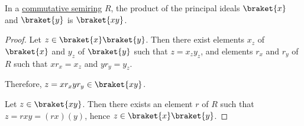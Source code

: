 \begin{proposition}\label{thm:product_of_principal_ideals}
  In a \hyperref[def:semiring/commutative]{commutative semiring} \( R \), the product of the principal ideals \( \braket{x} \) and \( \braket{y} \) is \( \braket{xy} \).
\end{proposition}
\begin{proof}
  \SufficiencySubProof Let \( z \in \braket{x} \braket{y} \). Then there exist elements \( x_z \) of \( \braket{x} \) and \( y_z \) of \( \braket{y} \) such that \( z = x_z y_z \), and elements \( r_x \) and \( r_y \) of \( R \) such that \( x r_x = x_z \) and \( y r_y = y_z \).

  Therefore, \( z = x r_x y r_y \in \braket{xy} \).

  \NecessitySubProof Let \( z \in \braket{xy} \). Then there exists an element \( r \) of \( R \) such that \( z = rxy = (rx)(y) \), hence \( z \in \braket{x} \braket{y} \).
\end{proof}
